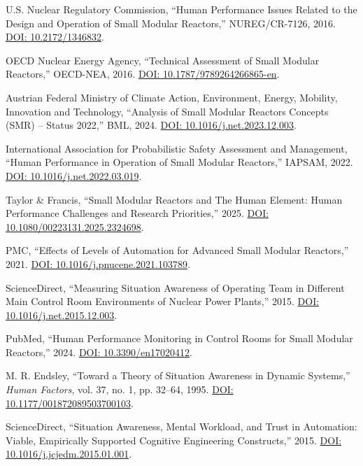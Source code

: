 \documentclass[conference]{IEEEtran}
\begin{document}
\begin{table}[t]
\begin{thebibliography}{54}
U.S. Nuclear Regulatory Commission, ``Human Performance Issues Related to the Design and Operation of Small Modular Reactors,'' NUREG/CR-7126, 2016. \href{https://doi.org/10.2172/1346832}{DOI: 10.2172/1346832}.

OECD Nuclear Energy Agency, ``Technical Assessment of Small Modular Reactors,'' OECD-NEA, 2016. \href{https://doi.org/10.1787/9789264266865-en}{DOI: 10.1787/9789264266865-en}.

Austrian Federal Ministry of Climate Action, Environment, Energy, Mobility, Innovation and Technology, ``Analysis of Small Modular Reactors Concepts (SMR) – Status 2022,'' BML, 2024. \href{https://doi.org/10.1016/j.net.2023.12.003}{DOI: 10.1016/j.net.2023.12.003}.

International Association for Probabilistic Safety Assessment and Management, ``Human Performance in Operation of Small Modular Reactors,'' IAPSAM, 2022. \href{https://doi.org/10.1016/j.net.2022.03.019}{DOI: 10.1016/j.net.2022.03.019}.

Taylor & Francis, ``Small Modular Reactors and The Human Element: Human Performance Challenges and Research Priorities,'' 2025. \href{https://doi.org/10.1080/00223131.2025.2324698}{DOI: 10.1080/00223131.2025.2324698}.

PMC, ``Effects of Levels of Automation for Advanced Small Modular Reactors,'' 2021. \href{https://doi.org/10.1016/j.pnucene.2021.103789}{DOI: 10.1016/j.pnucene.2021.103789}.

ScienceDirect, ``Measuring Situation Awareness of Operating Team in Different Main Control Room Environments of Nuclear Power Plants,'' 2015. \href{https://doi.org/10.1016/j.net.2015.12.003}{DOI: 10.1016/j.net.2015.12.003}.

PubMed, ``Human Performance Monitoring in Control Rooms for Small Modular Reactors,'' 2024. \href{https://doi.org/10.3390/en17020412}{DOI: 10.3390/en17020412}.

M. R. Endsley, ``Toward a Theory of Situation Awareness in Dynamic Systems,'' \emph{Human Factors}, vol. 37, no. 1, pp. 32--64, 1995. \href{https://doi.org/10.1177/001872089503700103}{DOI: 10.1177/001872089503700103}.

ScienceDirect, ``Situation Awareness, Mental Workload, and Trust in Automation: Viable, Empirically Supported Cognitive Engineering Constructs,'' 2015. \href{https://doi.org/10.1016/j.jcjedm.2015.01.001}{DOI: 10.1016/j.jcjedm.2015.01.001}.


\end{thebibliography}
\end{table}
\end{document}
